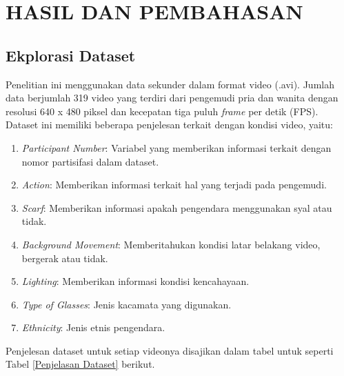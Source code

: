 
\chapter{HASIL DAN PEMBAHASAN}

\section{Ekplorasi Dataset}

    Penelitian ini menggunakan data sekunder dalam format video (.avi). Jumlah data berjumlah 319 video yang terdiri dari pengemudi pria dan wanita dengan resolusi 640 x 480 piksel dan kecepatan tiga puluh \textit{frame} per detik (FPS). Dataset ini memiliki beberapa penjelesan terkait dengan kondisi video, yaitu:
    
    \begin{enumerate}
        \item \textit{Participant Number}: Variabel yang memberikan informasi terkait dengan nomor partisifasi dalam dataset.
        \item \textit{Action}: Memberikan informasi terkait hal yang terjadi pada pengemudi.
        \item \textit{Scarf}:  Memberikan informasi apakah pengendara menggunakan syal atau tidak.
        \item \textit{Background Movement}: Memberitahukan kondisi latar belakang video, bergerak atau tidak.
        \item \textit{Lighting}: Memberikan informasi kondisi kencahayaan.
        \item  \textit{Type of Glasses}: Jenis kacamata yang digunakan.
        \item  \textit{Ethnicity}: Jenis etnis pengendara.
        
    \end{enumerate}

    Penjelesan dataset untuk setiap videonya disajikan dalam tabel untuk seperti Tabel \ref{Penjelasan Dataset} berikut.

